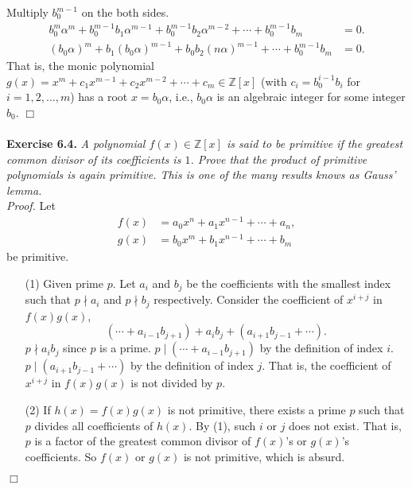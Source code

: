 \documentclass{article}
\begin{document}
Multiply $b_0^{m-1}$ on the both sides.
\begin{align*}
b_0^m \alpha^m + b_0^{m-1} b_1 \alpha^{m-1} + b_0^{m-1} b_2 \alpha^{m-2}
+ \cdots + b_0^{m-1} b_m &= 0. \\
(b_0\alpha)^m + b_1 (b_0\alpha)^{m-1} + b_0 b_2 (n\alpha)^{m-1}
+ \cdots + b_0^{m-1} b_m &= 0.
\end{align*}
That is, the monic polynomial
$g(x) = x^m + c_1 x^{m-1} + c_2 x^{m-2} + \cdots + c_m \in \mathbb{Z}[x]$
(with $c_i = b_0^{i - 1} b_i$ for $i = 1, 2, ..., m$)
has a root $x = b_0\alpha$, i.e.,
$b_0\alpha$ is an algebraic integer for some integer $b_0$.
$\Box$ \\\\



\textbf{Exercise 6.4.}
\emph{A polynomial $f(x) \in \mathbb{Z}[x]$ is said to be primitive
if the greatest common divisor of its coefficients is $1$.
Prove that the product of primitive polynomials is again primitive.
This is one of the many results knows as Gauss' lemma.} \\

\emph{Proof.}
Let
\begin{align*}
f(x) &= a_0 x^n + a_1 x^{n-1} + \cdots + a_n, \\
g(x) &= b_0 x^m + b_1 x^{n-1} + \cdots + b_m
\end{align*}
be primitive.
\begin{enumerate}
\item[(1)]
Given prime $p$.
Let $a_i$ and $b_j$ be the coefficients with the smallest index such that
$p \nmid a_i$ and $p \nmid b_j$ respectively.
Consider the coefficient of $x^{i+j}$ in $f(x)g(x)$,
$$(\cdots + a_{i-1} b_{j+1}) + a_i b_j + (a_{i+1} b_{j-1} + \cdots).$$
$p \nmid a_i b_j$ since $p$ is a prime.
$p \mid (\cdots + a_{i-1} b_{j+1})$ by the definition of index $i$.
$p \mid (a_{i+1} b_{j-1} + \cdots)$ by the definition of index $j$.
That is, the coefficient of $x^{i+j}$ in $f(x)g(x)$ is not divided by $p$.
\item[(2)]
If $h(x) = f(x)g(x)$ is not primitive,
there exists a prime $p$ such that $p$ divides all coefficients of $h(x)$.
By (1), such $i$ or $j$ does not exist.
That is, $p$ is a factor of the greatest common divisor of $f(x)$'s or $g(x)$'s coefficients.
So $f(x)$ or $g(x)$ is not primitive, which is absurd.
\end{enumerate}
$\Box$ \\\\
\end{document}
